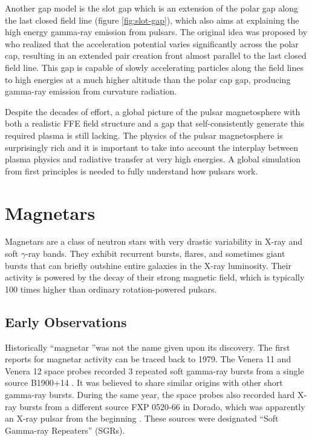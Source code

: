 Another gap model is the slot gap which is an extension of the polar gap along
the last closed field line (figure \ref{fig:slot-gap}), which also aims at
explaining the high energy gamma-ray emission from pulsars. The original idea
was proposed by \citet{arons_pair_1979} who realized that the acceleration
potential varies significantly across the polar cap, resulting in an extended
pair creation front almost parallel to the last closed field line. This gap is
capable of slowly accelerating particles along the field lines to high energies
at a much higher altitude than the polar cap gap, producing gamma-ray emission
from curvature radiation.

Despite the decades of effort, a global picture of the pulsar magnetosphere with
both a realistic FFE field structure and a gap that self-consistently generate
this required plasma is still lacking. The physics of the pulsar magnetosphere
is surprisingly rich and it is important to take into account the interplay
between plasma physics and radiative transfer at very high energies. A global
simulation from first principles is needed to fully understand how pulsars work.

\section{Magnetars}
\label{sec:intro-magnetars}

Magnetars are a class of neutron stars with very drastic variability in X-ray
and soft $\gamma$-ray bands. They exhibit recurrent bursts, flares, and
sometimes giant bursts that can briefly outshine entire galaxies in the X-ray
luminosity. Their activity is powered by the decay of their strong magnetic
field, which is typically 100 times higher than ordinary rotation-powered
pulsars.

\subsection{Early Observations}
\label{sec:intro-magnetar-observation}

Historically ``magnetar ''was not the name given upon its discovery. The first
reports for magnetar activity can be traced back to 1979. The Venera 11 and
Venera 12 space probes recorded 3 repeated soft gamma-ray bursts from a single
source B1900+14 \citep{mazets_soft_1979}. It was believed to share similar
origins with other short gamma-ray bursts. During the same year, the space
probes also recorded hard X-ray bursts from a different source FXP 0520-66 in
Dorado, which was apparently an X-ray pulsar from the beginning
\citep{mazets_observations_1979}. These sources were designated ``Soft Gamma-ray
Repeaters'' (SGRs).

